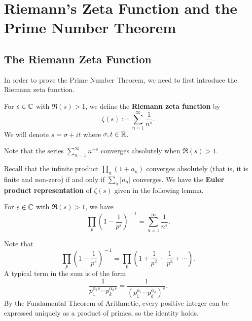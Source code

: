 \section{Riemann's Zeta Function and the Prime Number Theorem}\label{sec:3}

\subsection{The Riemann Zeta Function}\label{subsec:3.1}
In order to prove the Prime Number Theorem, we need to 
first introduce the Riemann zeta function. 

\begin{defn}\label{def:3.1}
For $s \in \mathbb{C}$ with $\Re(s) > 1$, we define the 
{\bf Riemann zeta function} by 
\[ \zeta(s) := \sum_{n=1}^\infty \frac1{n^s}. \]
We will denote $s = \sigma + it$ where $\sigma, t \in \mathbb{R}$. 
\end{defn}

Note that the series $\sum_{n=1}^\infty n^{-s}$ converges 
absolutely when $\Re(s) > 1$. 

Recall that the infinite product $\prod_n (1 + a_n)$ 
converges absolutely (that is, it is finite and non-zero)
if and only if $\sum_n |a_n|$ converges. We have the 
{\bf Euler product representation} of $\zeta(s)$ given 
in the following lemma. 

\begin{lemma}\label{lemma:3.2}
For $s \in \mathbb{C}$ with $\Re(s) > 1$, we have 
\[ \prod_p \left( 1 - \frac1{p^s} \right)^{\!-1} = 
\sum_{n=1}^\infty \frac1{n^s}. \]
\end{lemma}
\begin{pf}
Note that 
\[ \prod_p \left( 1 - \frac1{p^s} \right)^{\!-1} = 
\prod_p \left(1 + \frac1{p^2} + \frac1{p^3} + \cdots \right). \]
A typical term in the sum is of the form 
\[ \frac{1}{p_1^{\alpha_1s} \cdots p_k^{\alpha_ks}}
= \frac{1}{(p_1^{\alpha_1} \cdots p_k^{\alpha_k})^s}. \]
By the Fundamental Theorem of Arithmetic, every positive 
integer can be expressed uniquely as a product of primes, 
so the identity holds.
\end{pf}

